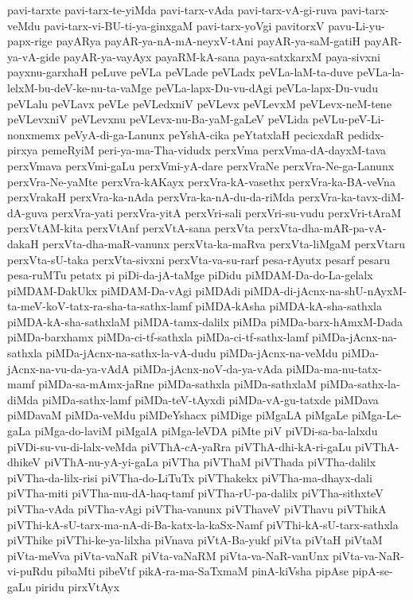 {pavi-tarxte
pavi-tarx-te-yiMda
pavi-tarx-vAda
pavi-tarx-vA-gi-ruva
pavi-tarx-veMdu
pavi-tarx-vi-BU-ti-ya-ginxgaM
pavi-tarx-yoVgi
pavitorxV
pavu-Li-yu-papx-rige
payARya
payAR-ya-nA-mA-neyxV-tAni
payAR-ya-saM-gatiH
payAR-ya-vA-gide
payAR-ya-vayAyx
payaRM-kA-sana
paya-satxkarxM
paya-sivxni
payxnu-garxhaH
peLuve
peVLa
peVLade
peVLadx
peVLa-laM-ta-duve
peVLa-la-lelxM-bu-deV-ke-nu-ta-vaMge
peVLa-lapx-Du-vu-dAgi
peVLa-lapx-Du-vudu
peVLalu
peVLavx
peVLe
peVLedxniV
peVLevx
peVLevxM
peVLevx-neM-tene
peVLevxniV
peVLevxnu
peVLevx-nu-Ba-yaM-gaLeV
peVLida
peVLu-peV-Li-nonxmemx
peVyA-di-ga-Lanunx
peYshA-cika
peYtatxlaH
pecicxdaR
pedidx-pirxya
pemeRyiM
peri-ya-ma-Tha-vidudx
perxVma
perxVma-dA-dayxM-tava
perxVmava
perxVmi-gaLu
perxVmi-yA-dare
perxVraNe
perxVra-Ne-ga-Lanunx
perxVra-Ne-yaMte
perxVra-kAKayx
perxVra-kA-vasethx
perxVra-ka-BA-veVna
perxVrakaH
perxVra-ka-nAda
perxVra-ka-nA-du-da-riMda
perxVra-ka-tavx-diM-dA-guva
perxVra-yati
perxVra-yitA
perxVri-sali
perxVri-su-vudu
perxVri-tAraM
perxVtAM-kita
perxVtAnf
perxVtA-sana
perxVta
perxVta-dha-mAR-pa-vA-dakaH
perxVta-dha-maR-vanunx
perxVta-ka-maRva
perxVta-liMgaM
perxVtaru
perxVta-sU-taka
perxVta-sivxni
perxVta-va-su-rarf
pesa-rAyutx
pesarf
pesaru
pesa-ruMTu
petatx
pi
piDi-da-jA-taMge
piDidu
piMDAM-Da-do-La-gelalx
piMDAM-DakUkx
piMDAM-Da-vAgi
piMDAdi
piMDA-di-jAcnx-na-shU-nAyxM-ta-meV-koV-tatx-ra-sha-ta-sathx-lamf
piMDA-kAsha
piMDA-kA-sha-sathxla
piMDA-kA-sha-sathxlaM
piMDA-tamx-dalilx
piMDa
piMDa-barx-hAmxM-Dada
piMDa-barxhamx
piMDa-ci-tf-sathxla
piMDa-ci-tf-sathx-lamf
piMDa-jAcnx-na-sathxla
piMDa-jAcnx-na-sathx-la-vA-dudu
piMDa-jAcnx-na-veMdu
piMDa-jAcnx-na-vu-da-ya-vAdA
piMDa-jAcnx-noV-da-ya-vAda
piMDa-ma-nu-tatx-mamf
piMDa-sa-mAmx-jaRne
piMDa-sathxla
piMDa-sathxlaM
piMDa-sathx-la-diMda
piMDa-sathx-lamf
piMDa-teV-tAyxdi
piMDa-vA-gu-tatxde
piMDava
piMDavaM
piMDa-veMdu
piMDeYshacx
piMDige
piMgaLA
piMgaLe
piMga-Le-gaLa
piMga-do-laviM
piMgalA
piMga-leVDA
piMte
piV
piVDi-sa-ba-lalxdu
piVDi-su-vu-di-lalx-veMda
piVThA-cA-yaRra
piVThA-dhi-kA-ri-gaLu
piVThA-dhikeV
piVThA-nu-yA-yi-gaLa
piVTha
piVThaM
piVThada
piVTha-dalilx
piVTha-da-lilx-risi
piVTha-do-LiTuTx
piVThakekx
piVTha-ma-dhayx-dali
piVTha-miti
piVTha-mu-dA-haq-tamf
piVTha-rU-pa-dalilx
piVTha-sithxteV
piVTha-vAda
piVTha-vAgi
piVTha-vanunx
piVThaveV
piVThavu
piVThikA
piVThi-kA-sU-tarx-ma-nA-di-Ba-katx-la-kaSx-Namf
piVThi-kA-sU-tarx-sathxla
piVThike
piVThi-ke-ya-lilxha
piVnava
piVtA-Ba-yukf
piVta
piVtaH
piVtaM
piVta-meVva
piVta-vaNaR
piVta-vaNaRM
piVta-va-NaR-vanUnx
piVta-va-NaR-vi-puRdu
pibaMti
pibeVtf
pikA-ra-ma-SaTxmaM
pinA-kiVsha
pipAse
pipA-se-gaLu
piridu
pirxVtAyx
}
